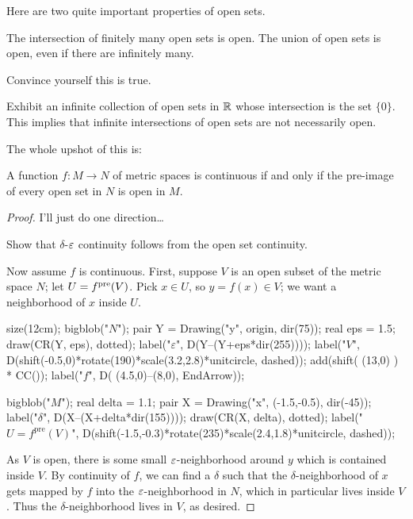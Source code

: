 Here are two quite important properties of open sets.
\begin{proposition}
	\listhack
	\begin{enumerate}[(a)]
		\ii The intersection of finitely many open sets is open.
		\ii The union of open sets is open, even if there are infinitely many.
	\end{enumerate}
\end{proposition}
\begin{ques}
	Convince yourself this is true.
\end{ques}
\begin{exercise}
	Exhibit an infinite collection of open sets in $\mathbb R$
	whose intersection is the set $\{0\}$.
	This implies that infinite intersections of open sets are not necessarily open.
\end{exercise}

The whole upshot of this is:
\begin{theorem}
	A function $f : M \to N$ of metric spaces is continuous
	if and only if the pre-image of every open set in $N$ is open in $M$.
\end{theorem}
\begin{proof}
	I'll just do one direction\dots
	\begin{exercise}
		Show that $\delta$-$\varepsilon$ continuity follows from
		the open set continuity.
	\end{exercise}
	Now assume $f$ is continuous.
	First, suppose $V$ is an open subset of the metric space $N$;
	let $U = f^{\text{pre}}(V)$. Pick $x \in U$, so $y = f(x) \in V$; we want a neighborhood of $x$ inside $U$.

	\begin{center}
		\begin{asy}
			size(12cm);
			bigblob("$N$");
			pair Y = Drawing("y", origin, dir(75));
			real eps = 1.5;
			draw(CR(Y, eps), dotted);
			label("$\varepsilon$", D(Y--(Y+eps*dir(255))));
			label("$V$",
				D(shift(-0.5,0)*rotate(190)*scale(3.2,2.8)*unitcircle, dashed));
			add(shift( (13,0) ) * CC());
			label("$f$", D( (4.5,0)--(8,0), EndArrow));

			bigblob("$M$");
			real delta = 1.1;
			pair X = Drawing("x", (-1.5,-0.5), dir(-45));
			label("$\delta$", D(X--(X+delta*dir(155))));
			draw(CR(X, delta), dotted);
			label("$U = f^{\text{pre}}(V)$",
				D(shift(-1.5,-0.3)*rotate(235)*scale(2.4,1.8)*unitcircle, dashed));
		\end{asy}
	\end{center}

	As $V$ is open, there is some small $\varepsilon$-neighborhood around $y$
	which is contained inside $V$.
	By continuity of $f$, we can find a $\delta$ such that the $\delta$-neighborhood
	of $x$ gets mapped by $f$ into the $\varepsilon$-neighborhood in $N$, 
	which in particular lives inside $V$.
	Thus the $\delta$-neighborhood lives in $V$, as desired.
\end{proof}

